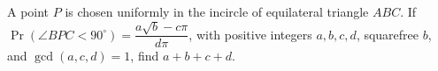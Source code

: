 A point $P$ is chosen uniformly in the incircle of equilateral triangle $ABC$. If $\Pr(\angle BPC<90^\circ)=\dfrac{a\sqrt b-c\pi}{d\pi}$, with positive integers $a,b,c,d$, squarefree $b$, and $\gcd(a,c,d)=1$, find $a+b+c+d$.

